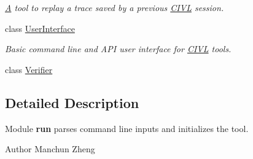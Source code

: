 \begin{DoxyCompactItemize}
\begin{DoxyCompactList}\small\item\em \hyperlink{structA}{A} tool to replay a trace saved by a previous \hyperlink{classedu_1_1udel_1_1cis_1_1vsl_1_1civl_1_1CIVL}{C\+I\+V\+L} session. \end{DoxyCompactList}\item 
class \hyperlink{classedu_1_1udel_1_1cis_1_1vsl_1_1civl_1_1run_1_1IF_1_1UserInterface}{User\+Interface}
\begin{DoxyCompactList}\small\item\em Basic command line and A\+P\+I user interface for \hyperlink{classedu_1_1udel_1_1cis_1_1vsl_1_1civl_1_1CIVL}{C\+I\+V\+L} tools. \end{DoxyCompactList}\item 
class \hyperlink{classedu_1_1udel_1_1cis_1_1vsl_1_1civl_1_1run_1_1IF_1_1Verifier}{Verifier}
\end{DoxyCompactItemize}


\subsection{Detailed Description}
Module {\bfseries run} parses command line inputs and initializes the tool. 

\begin{DoxyAuthor}{Author}
Manchun Zheng 
\end{DoxyAuthor}
